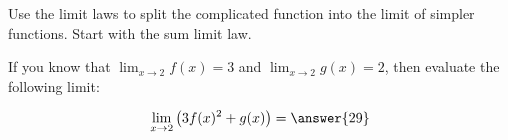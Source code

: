 \documentclass{ximera}
\author{Steven Gubkin}
\begin{document}
\begin{exercise}
	\begin{hint}
		Use the limit laws to split the complicated function into the limit of simpler functions. Start with the sum limit law.
	\end{hint}
	If you know that $\lim_{x \to 2} f(x) = 3$ and $\lim_{x \to 2} g(x) = 2$, then evaluate the following limit:
	
	\[
		\lim_{x \to 2} \left( 3 f(x)^2 + g(x) \right) = \answer{29}
	\]
	
\end{exercise}
\end{document}

